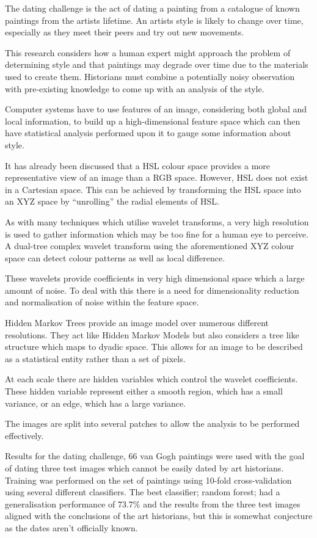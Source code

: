 \documentclass[conference]{IEEEtran}
\begin{document}
The dating challenge is the act of dating a painting from a catalogue of known
paintings from the artists lifetime. An artists style is likely to change over
time, especially as they meet their peers and try out new movements.

This research considers how a human expert might approach the problem of
determining style and that paintings may degrade over time due to the materials
used to create them. Historians must combine a potentially noisy observation
with pre-existing knowledge to come up with an analysis of the style.

Computer systems have to use features of an image, considering both global and
local information, to build up a high-dimensional feature space which can then
have statistical analysis performed upon it to gauge some information about
style.

It has already been discussed that a \gls{HSL} colour space provides a more
representative view of an image than a \gls{RGB} space. However, \gls{HSL} does
not exist in a Cartesian space. This can be achieved by transforming the
\gls{HSL} space into an XYZ space by ``unrolling'' the radial elements of
\gls{HSL}.

As with many techniques which utilise wavelet transforms, a very high
resolution is used to gather information which may be too fine for a human eye
to perceive. A dual-tree complex wavelet transform using the aforementioned XYZ
colour space can detect colour patterns as well as local difference.

These wavelets provide coefficients in very high dimensional space which a
large amount of noise. To deal with this there is a need for dimensionality
reduction and normalisation of noise within the feature space.

Hidden Markov Trees provide an image model over numerous different resolutions.
They act like Hidden Markov Models but also considers a tree like structure
which maps to dyadic space. This allows for an image to be described as a
statistical entity rather than a set of pixels.

At each scale there are hidden variables which control the wavelet
coefficients. These hidden variable represent either a smooth region, which has
a small variance, or an edge, which has a large variance.

The images are split into several patches to allow the analysis to be performed
effectively.

Results for the dating challenge, 66 van Gogh paintings were used with the goal
of dating three test images which cannot be easily dated by art historians.
Training was performed on the set of paintings using 10-fold cross-validation
using several different classifiers. The best classifier; random forest; had a
generalisation performance of 73.7\% and the results from the three test images
aligned with the conclusions of the art historians, but this is somewhat
conjecture as the dates aren't officially known.
\end{document}
